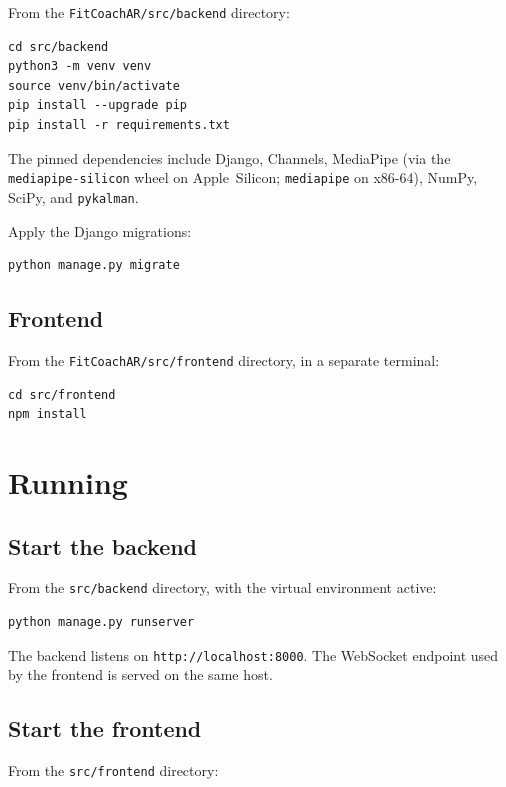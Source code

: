 \documentclass{article}
\begin{document}
From the \texttt{FitCoachAR/src/backend} directory:

\begin{verbatim}
cd src/backend
python3 -m venv venv
source venv/bin/activate
pip install --upgrade pip
pip install -r requirements.txt
\end{verbatim}

The pinned dependencies include Django, Channels, MediaPipe (via the
\texttt{mediapipe-silicon} wheel on Apple~Silicon;
\texttt{mediapipe} on x86-64), NumPy, SciPy, and \texttt{pykalman}.

Apply the Django migrations:

\begin{verbatim}
python manage.py migrate
\end{verbatim}

\subsection{Frontend}

From the \texttt{FitCoachAR/src/frontend} directory, in a separate
terminal:

\begin{verbatim}
cd src/frontend
npm install
\end{verbatim}

\section{Running \progname}

\subsection{Start the backend}

From the \texttt{src/backend} directory, with the virtual environment
active:

\begin{verbatim}
python manage.py runserver
\end{verbatim}

The backend listens on \texttt{http://localhost:8000}. The WebSocket
endpoint used by the frontend is served on the same host.

\subsection{Start the frontend}

From the \texttt{src/frontend} directory:
\end{document}
